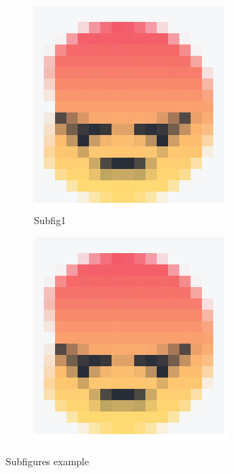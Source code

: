 \documentclass{article}
\begin{document}
        \begin{figure}[H]
            \begin{subfigure}[H]{0.19\linewidth} %
                \includegraphics[width=\linewidth]{angery.png}
                \caption{Subfig1}
            \end{subfigure}
            \begin{subfigure}[H]{0.8\linewidth}
                \includegraphics[width=\linewidth]{angery.png}
            \end{subfigure}
            \caption{Subfigures example}
            \label{fig:subAngeries}
        \end{figure}
\end{document}
